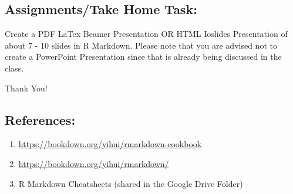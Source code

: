 \documentclass[
]{article}
\providecommand{\tightlist}{%
  \setlength{\itemsep}{0pt}\setlength{\parskip}{0pt}}
\begin{document}
\hypertarget{assignmentstake-home-task}{%
\subsection{Assignments/Take Home
Task:}\label{assignmentstake-home-task}}

Create a PDF LaTex Beamer Presentation OR HTML Ioslides Presentation of
about 7 - 10 slides in R Markdown. Please note that you are advised not
to create a PowerPoint Presentation since that is already being
discussed in the class.

Thank You!

\hypertarget{references}{%
\subsection{References:}\label{references}}

\begin{enumerate}
\def\labelenumi{\arabic{enumi}.}
\tightlist
\item
  \url{https://bookdown.org/yihui/rmarkdown-cookbook}
\item
  \url{https://bookdown.org/yihui/rmarkdown/}
\item
  R Markdown Cheatsheets (shared in the Google Drive Folder)
\end{enumerate}
\end{document}
